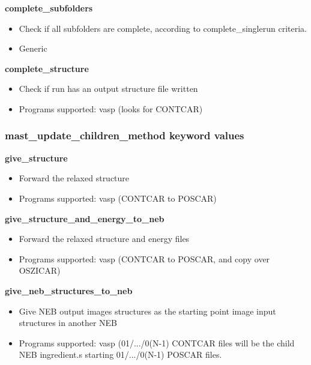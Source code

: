 \documentclass[letterpaper,10pt,english]{sphinxmanual}
\begin{document}
\textbf{complete\_subfolders}
\begin{itemize}
\item {} 
Check if all subfolders are complete, according to complete\_singlerun criteria.

\item {} 
Generic

\end{itemize}

\textbf{complete\_structure}
\begin{itemize}
\item {} 
Check if run has an output structure file written

\item {} 
Programs supported: vasp (looks for CONTCAR)

\end{itemize}


\subsubsection{mast\_update\_children\_method keyword values}
\label{3_1_2_ingredients:mast-update-children-method-keyword-values}
\textbf{give\_structure}
\begin{itemize}
\item {} 
Forward the relaxed structure

\item {} 
Programs supported: vasp (CONTCAR to POSCAR)

\end{itemize}

\textbf{give\_structure\_and\_energy\_to\_neb}
\begin{itemize}
\item {} 
Forward the relaxed structure and energy files

\item {} 
Programs supported: vasp (CONTCAR to POSCAR, and copy over OSZICAR)

\end{itemize}

\textbf{give\_neb\_structures\_to\_neb}
\begin{itemize}
\item {} 
Give NEB output images structures as the starting point image input structures in another NEB

\item {} 
Programs supported: vasp (01/.../0(N-1) CONTCAR files will be the child NEB ingredient.s starting 01/.../0(N-1) POSCAR files.

\end{itemize}
\end{document}
